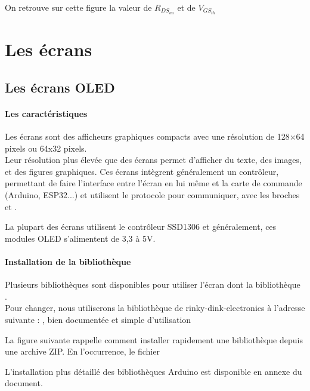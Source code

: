 

 On retrouve sur cette figure la valeur de $R_{DS_{on}}$ et de $V_{GS_{th}}$\part{Les écrans}

\chapter{Les écrans OLED}

\subsection{Les caractéristiques}
Les écrans  sont des afficheurs graphiques 
compacts avec une résolution de 128×64 pixels ou 64x32 pixels.\\
Leur résolution plus élevée que des écrans  permet d’afficher du texte, des images, et des figures 
graphiques. Ces écrans intègrent généralement un contrôleur, permettant de faire l’interface entre l’écran
en lui même et la carte de commande (Arduino, ESP32...) et utilisent le protocole  pour communiquer, avec les broches  et .


La plupart des écrans utilisent le contrôleur SSD1306 et généralement, ces modules OLED s’alimentent de 3,3 à 5V.


\subsection{Installation de la bibliothèque}

Plusieurs bibliothèques sont disponibles pour utiliser l'écran dont la bibliothèque .\\

Pour changer, nous utiliserons la bibliothèque de rinky-dink-electronics à l'adresse suivante : 
,  bien documentée et simple d’utilisation

La figure suivante rappelle comment installer rapidement une bibliothèque depuis une archive ZIP.
En l’occurrence, le fichier 

L'installation plus détaillé des bibliothèques Arduino est disponible en annexe du document.



